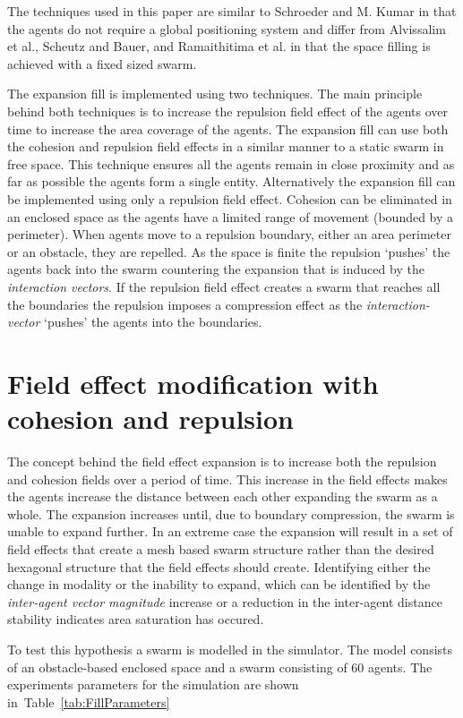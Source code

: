 \documentclass[10pt,journal,letterpaper,twoside]{IEEEtran}
\begin{document}
The techniques used in this paper are similar to Schroeder and M. Kumar in that the agents do not require a global positioning system and differ from Alvissalim et al., Scheutz and Bauer, and Ramaithitima et al. in that the space filling is achieved with a fixed sized swarm. 

The expansion fill is implemented using two techniques. The main principle behind both techniques is to increase the repulsion field effect of the agents over time to increase the area coverage of the agents. The expansion fill can use both the cohesion and repulsion field effects in a similar manner to a static swarm in free space. This technique ensures all the agents remain in close proximity and as far as possible the agents form a single entity. Alternatively the expansion fill can be implemented using only a repulsion field effect. Cohesion can be eliminated in an enclosed space as the agents have a limited range of movement (bounded by a perimeter). When agents move to a repulsion boundary, either an area perimeter or an obstacle, they are repelled. As the space is finite the repulsion `pushes' the agents back into the swarm countering the expansion that is induced by the \textit{interaction vectors}. If the repulsion field effect creates a swarm that reaches all the boundaries the repulsion imposes a compression effect as the \textit{interaction-vector} `pushes' the agents into the boundaries. 

\section{Field effect modification with cohesion and repulsion}
The concept behind the field effect expansion is to increase both the repulsion and cohesion fields over a period of time. This increase in the field effects makes the agents increase the distance between each other expanding the swarm as a whole. The expansion increases until, due to boundary compression, the swarm is unable to expand further. In an extreme case the expansion will result in a set of field effects that create a mesh based swarm structure rather than the desired hexagonal structure that the field effects should create. Identifying either the change in modality or the inability to expand, which can be identified by the \textit{inter-agent vector magnitude} increase or a reduction in the inter-agent distance stability indicates area saturation has occured.

To test this hypothesis a swarm is modelled in the simulator. The model consists of an obstacle-based enclosed space and a swarm consisting of 60 agents. The experiments parameters for the simulation are shown in~Table~\ref{tab:FillParameters}
\end{document}
